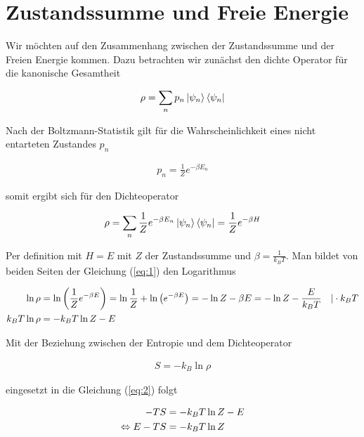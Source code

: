 
\usepackage{amsmath} 





\section*{Zustandssumme und Freie Energie}

Wir möchten auf den Zusammenhang zwischen der Zustandssumme und der Freien Energie kommen. Dazu betrachten wir zunächst den dichte Operator für die kanonische Gesamtheit


\begin{align}
  \label{eq:7}
  \rho = \sum_n p_n \left| \psi_n \right\rangle\left\langle \psi_n \right|
\end{align}

Nach der Boltzmann-Statistik gilt für die Wahrscheinlichkeit eines nicht entarteten Zustandes \(p_n\)

\begin{align}
  \label{eq:8}
  p_n = \frac{1}{Z}e^{-\beta E_n}
\end{align}

somit ergibt sich für den Dichteoperator

\begin{align}
  \label{eq:1}
  \rho = \sum_n \frac{1}{Z}e^{-\beta E_n} \left| \psi_n \right\rangle\left\langle \psi_n \right| = \frac{1}{Z}e^{-\beta H}
\end{align}

Per definition mit \(H=E\) mit \(Z\) der Zustandssumme und \(\beta=\frac{1}{k_B T}\). Man bildet von beiden Seiten der Gleichung (\ref{eq:1}) den Logarithmus

\begin{align}
  \label{eq:2}
  \ln \rho &= \ln\left( \frac{1}{Z}e^{-\beta E} \right) = \ln\frac{1}{Z} + \ln\left( e^{-\beta E}\right) = - \ln Z -\beta E =  - \ln Z - \frac{E}{k_B T} \quad | \cdot k_B T \notag \\
k_B T \ln \rho &=   - k_B T \ln Z - E
\end{align}

Mit der Beziehung zwischen der Entropie und dem Dichteoperator

\begin{align}
  \label{eq:3}
  S = -k_B \ln\rho
\end{align}

eingesetzt in die Gleichung (\ref{eq:2}) folgt

\begin{align}
  \label{eq:4}
  -TS &=  - k_B T \ln Z - E \notag \\
\Leftrightarrow E - TS &=  - k_B T \ln Z
\end{align}

